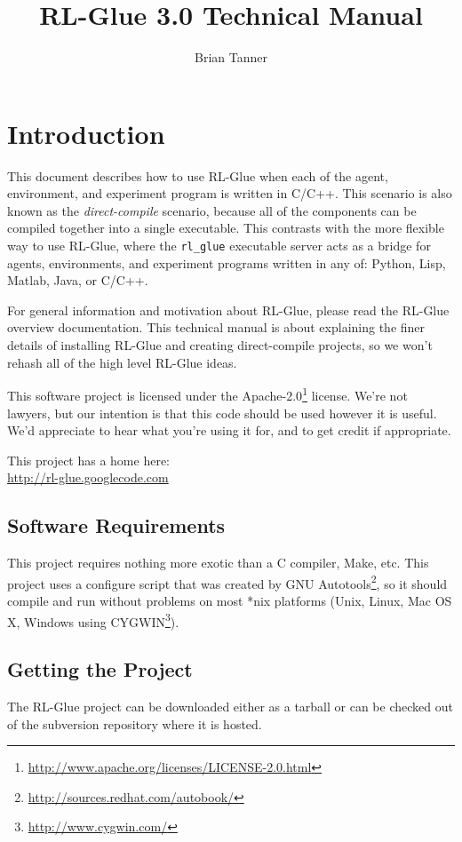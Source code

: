 \documentclass[11pt]{article}
\title{RL-Glue 3.0 Technical Manual }
\author{Brian Tanner}
\date{}
\begin{document}
\maketitle
\tableofcontents

\section{Introduction}

This document describes how to use RL-Glue when each of the agent, environment, and experiment program is written in C/C++.  This scenario is also known as the \textit{direct-compile} scenario, because all of the
components can be compiled together into a single executable.  This contrasts with the more flexible way to use RL-Glue, where the \texttt{rl\_glue} executable server acts as a bridge for agents, environments, and experiment 
programs written in any of: Python, Lisp, Matlab, Java, or C/C++.  

For general information and motivation about RL-Glue, please read the RL-Glue overview documentation.  This technical manual is about explaining the finer details of installing RL-Glue and creating direct-compile projects, 
so we won't rehash all of the high level RL-Glue ideas.

This software project is licensed under the Apache-2.0\footnote{\url{http://www.apache.org/licenses/LICENSE-2.0.html}} license. We're not lawyers, but our intention is that this code 
should be used however it is useful.  We'd appreciate to hear what you're using it for, and to get credit if appropriate.

This project has a home here:\\
\url{http://rl-glue.googlecode.com}



\subsection{Software Requirements}
This project requires nothing more exotic than a C compiler, Make, etc.  This project uses a configure script that was created by GNU 
Autotools\footnote{\url{http://sources.redhat.com/autobook/}}, so it should compile and run without problems 
on most *nix platforms (Unix, Linux, Mac OS X, Windows using CYGWIN\footnote{\url{http://www.cygwin.com/}}). 

\subsection{Getting the Project}
The RL-Glue project can be downloaded either as a tarball or can be checked out of the subversion repository where it is hosted.
\end{document}
